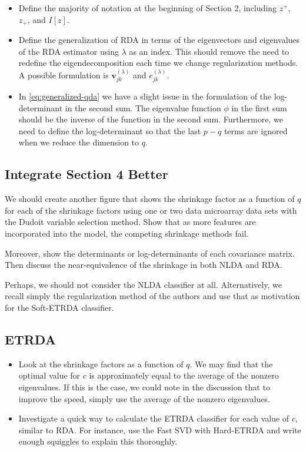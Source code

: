 \documentclass[11pt]{article}
\begin{document}
\begin{itemize}
	\item Define the majority of notation at the beginning of Section 2, including $z^+$, $z_+$, and $I[z]$.
	\item Define the generalization of RDA in terms of the eigenvectors and eigenvalues of the RDA estimator using $\lambda$ as an index. This should remove the need to redefine the eigendecomposition each time we change regularization methods. A possible formulation is $\bm v_{jk}^{(\lambda)}$ and $e_{jk}^{(\lambda)}$.
	\item In \eqref{eq:generalized-qda} we have a slight issue in the formulation of the log-determinant in the second sum. The eigenvalue function $\phi$ in the first sum should be the inverse of the function in the second sum. Furthermore, we need to define the log-determinant so that the last $p - q$ terms are ignored when we reduce the dimension to $q$.
\end{itemize}

\subsection{Integrate Section 4 Better}

We should create another figure that shows the shrinkage factor as a function of $q$ for each of the shrinkage factors using one or two data microarray data sets with the Dudoit variable selection method. Show that as more features are incorporated into the model, the competing shrinkage methods fail.

Moreover, show the determinants or log-determinants of each covariance matrix. Then discuss the near-equivalence of the shrinkage in both NLDA and RDA.

Perhaps, we should not consider the NLDA classifier at all. Alternatively, we recall simply the regularization method of the authors and use that as motivation for the Soft-ETRDA classifier.

\subsection{ETRDA}

\begin{itemize}
	\item Look at the shrinkage factors as a function of $q$. We may find that the optimal value for $c$ is approximately equal to the average of the nonzero eigenvalues. If this is the case, we could note in the discussion that to improve the speed, simply use the average of the nonzero eigenvalues.
	\item Investigate a quick way to calculate the ETRDA classifier for each value of $c$, similar to RDA. For instance, use the Fast SVD with Hard-ETRDA and write enough squiggles to explain this thoroughly.
\end{itemize}
\end{document}
